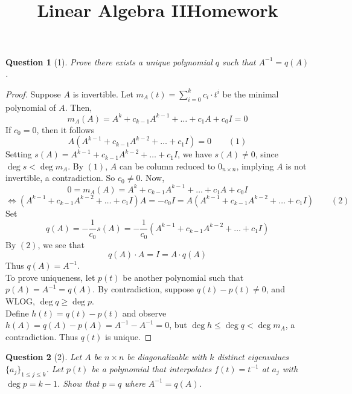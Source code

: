 \documentclass[11pt]{article}
\title{\vspace{-50pt}
\Huge \name
\\\vspace{20pt}
\huge Linear Algebra II\hfill Homework \hw}
\author{}
\date{}
\theoremstyle{quest}
\newtheorem*{question}{Question}
\begin{document}
\maketitle

\begin{question}[1]
Prove there exists a unique polynomial $q$ such that $A^{-1} = q(A)$.
\end{question}
\begin{proof}
Suppose $A$ is invertible. Let $m_A(t) = \sum_{i = 0}^k c_i \cdot t^i$ be the minimal polynomial of $A$. Then,
$$m_A(A) = A^k + c_{k-1} A^{k-1} + \ldots + c_1 A + c_0 I = 0$$
If $c_0 = 0$, then it follows
$$A(A^{k-1} + c_{k-1}A^{k-2} + \ldots + c_1 I) = 0\ \ \ \ \ \ \ \ \ (1)$$
Setting $s(A) = A^{k-1} + c_{k-1}A^{k-2} + \ldots + c_1 I$, we have $s(A) \ne 0$, since $\deg s < \deg m_A$. By $(1)$, $A$ can be column reduced to $0_{n \times n}$, implying $A$ is not invertible, a contradiction. So $c_0 \ne 0$. Now,
$$0 = m_A(A) = A^k + c_{k-1} A^{k-1} + \ldots + c_1 A + c_0 I $$
$$\iff (A^{k-1} + c_{k-1}A^{k-2} + \ldots + c_1 I)A = -c_0 I = A(A^{k-1} + c_{k-1}A^{k-2} + \ldots + c_1 I)\ \ \ \ \ \ \ \ \ (2)$$
Set $$q(A) = -\frac{1}{c_0} s(A) = -\frac{1}{c_0} (A^{k-1} + c_{k-1}A^{k-2} + \ldots + c_1 I)$$
By $(2)$, we see that
$$q(A) \cdot A = I = A \cdot q(A)$$
Thus $q(A) = A^{-1}$.\\
To prove uniqueness, let $p(t)$ be another polynomial such that $p(A) = A^{-1} = q(A)$. By contradiction, suppose $q(t) - p(t) \ne 0$, and WLOG, $\deg q \ge \deg p$. \\Define $h(t) = q(t) - p(t)$ and observe $h(A) = q(A) - p(A) = A^{-1} - A^{-1} = 0$, but $\deg h \le \deg q < \deg m_A$, a contradiction. Thus $q(t)$ is unique.
\end{proof}
\begin{question}[2]
Let $A$ be $n \times n$ be diagonalizable with $k$ distinct eigenvalues $\{a_j\}_{1 \le j \le k}$. Let $p(t)$ be a polynomial that interpolates $f(t) = t^{-1}$ at $a_j$ with $\deg p = k-1$. Show that $p = q$ where $A^{-1} = q(A)$.
\end{question}
\end{document}
